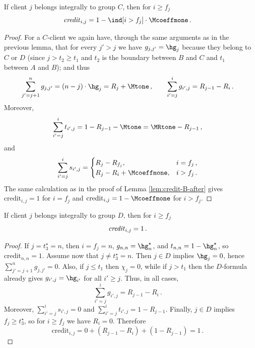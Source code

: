 \begin{lemma}
\label{lem:credit-C-after}
    If client $j$ belongs integrally to group $C$, then for $i \geq f_j$
    \begin{equation*}
        \text{\emph{credit}}_{i,j} = 1 - \ind[i > f_j] \cdot \Mcoeffmone\,.
    \end{equation*}
\end{lemma}
\begin{proof}
    For a $C$-client we again have, through the same arguments as in the previous lemma, that for every $j' > j$ we have $g_{j,j'} = \hg_j$ because they belong to $C$ or $D$ (since $j>t_2\geq t_1$ and $t_2$ is the boundary between $B$ and $C$ and $t_1$ between $A$ and $B$); and thus
    \begin{equation*}
        \sum_{j'=j+1}^n g_{j,j'} = (n-j) \cdot \hg_j = R_j + \Mtone\,,
        \qquad
        \sum_{i'=j}^{i} g_{i',j} = R_{j-1}-R_i\,.
    \end{equation*}
    Moreover,
    \begin{equation*}
        \sum_{i'=j}^{i} t_{i',j} = 1-R_{j-1}-\Mtone = \MRtone-R_{j-1}\,,
    \end{equation*}
    and
    \begin{equation*}
        \sum_{i'=j}^{i} s_{i',j} =
        \begin{cases}
            R_j-R_{f_j}, & i=f_j\,,\\
            R_j-R_i+\Mcoeffmone, & i>f_j\,.
        \end{cases}
    \end{equation*}
    The same calculation as in the proof of Lemma \ref{lem:credit-B-after} gives $\text{credit}_{i,j}=1$ for $i=f_j$ and $\text{credit}_{i,j}=1-\Mcoeffmone$ for $i>f_j$.
\end{proof}

\begin{lemma}
    \label{lem:credit-D-after}
    If client $j$ belongs integrally to group $D$, then for $i \geq f_j$
    \begin{equation*}
        \text{\emph{credit}}_{i,j} = 1\,.
    \end{equation*}
\end{lemma}
\begin{proof}
    If $j=t_3^\star=n$, then $i=f_j=n$, $g_{n,n}=\hg_n^\star$, and $t_{n,n}=1-\hg_n^\star$, so $\text{credit}_{n,n}=1$.
    Assume now that $j \neq t_3^\star=n$.
    Then $j \in D$ implies $\hg_j=0$, hence $\sum_{j'=j+1}^n g_{j,j'}=0$.
    Also, if $j \le t_1$ then $\chi_j=0$, while if $j>t_1$ then the $D$-formula already gives $g_{i',j}=\hg_{i'}$ for all $i' \ge j$.
    Thus, in all cases,
    \begin{equation*}
        \sum_{i'=j}^{i} g_{i',j} = R_{j-1}-R_i\,.
    \end{equation*}
    Moreover, $\sum_{i'=j}^{i} s_{i',j}=0$ and $\sum_{i'=j}^{i} t_{i',j}=1-R_{j-1}$.
    Finally, $j \in D$ implies $f_j \ge t_3^\star$, so for $i \ge f_j$ we have $R_i=0$.
    Therefore
    \begin{equation*}
        \text{credit}_{i,j} = 0 + (R_{j-1}-R_i) + (1-R_{j-1}) = 1\,.
    \end{equation*}
\end{proof}

